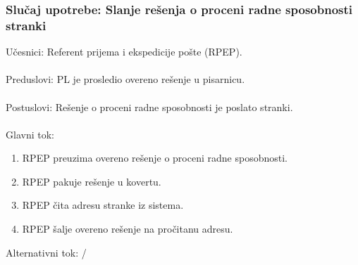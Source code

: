 \subsubsection{Slu\v caj upotrebe: Slanje re\v senja o proceni radne sposobnosti stranki}
\label{su: slanje resenja o radnoj sposobnosti}

\noindent U\v cesnici: Referent prijema i ekspedicije po\v ste (RPEP).
\\
\\ Preduslovi: PL je prosledio overeno re\v senje u pisarnicu.
\\
\\ Postuslovi: Rešenje o proceni radne sposobnosti je poslato stranki.
\\
\\ Glavni tok:
\begin{enumerate}
	\item RPEP preuzima overeno re\v senje o proceni radne sposobnosti.
	\item RPEP pakuje re\v senje u kovertu.
	\item RPEP \v cita adresu stranke iz sistema.
	\item RPEP \v salje overeno re\v senje na pro\v citanu adresu.
\end{enumerate}


\noindent Alternativni tok: /

